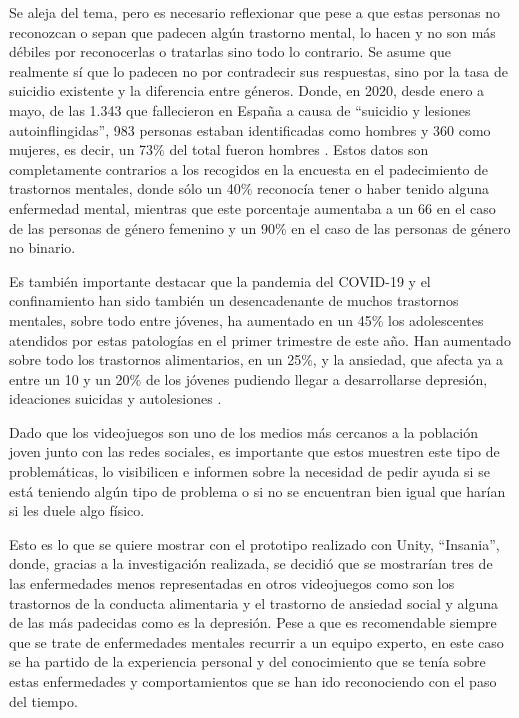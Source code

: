 \documentclass[12pt, a4paper,twoside,titlepage]{book}
\begin{document}
Se aleja del tema, pero es necesario reflexionar que pese a que estas personas no reconozcan o sepan que padecen algún trastorno mental, lo hacen y no son más débiles por reconocerlas o tratarlas sino todo lo contrario. Se asume que realmente sí que lo padecen no por contradecir sus respuestas, sino por la tasa de suicidio existente y la diferencia entre géneros. Donde, en 2020, desde enero a mayo, de las 1.343 que fallecieron en España a causa de ``suicidio y lesiones autoinflingidas'', 983 personas estaban identificadas como hombres y 360 como mujeres, es decir, un 73\% del total fueron hombres \cite{datosINEsuicidio}. Estos datos son completamente contrarios a los recogidos en la encuesta en el padecimiento de trastornos mentales, donde sólo un 40\% reconocía tener o haber tenido alguna enfermedad mental, mientras que este porcentaje aumentaba a un 66 en el caso de las personas de género femenino y un 90\% en el caso de las personas de género no binario. 

Es también importante destacar que la pandemia del COVID-19 y el confinamiento han sido también un desencadenante de muchos trastornos mentales, sobre todo entre jóvenes, ha aumentado en un 45\% los adolescentes atendidos por estas patologías en el primer trimestre de este año. Han aumentado sobre todo los trastornos alimentarios, en un 25\%, y la ansiedad, que afecta ya a entre un 10 y un 20\% de los jóvenes pudiendo llegar a desarrollarse depresión, ideaciones suicidas y autolesiones \cite{datosEnfJovenes}.  


Dado que los videojuegos son uno de los medios más cercanos a la población joven junto con las redes sociales, es importante que estos muestren este tipo de problemáticas, lo visibilicen e informen sobre la necesidad de pedir ayuda si se está teniendo algún tipo de problema o si no se encuentran bien igual que harían si les duele algo físico. 

Esto es lo que se quiere mostrar con el prototipo realizado con Unity, ``Insania'', donde, gracias a la investigación realizada, se decidió que se mostrarían tres de las enfermedades menos representadas en otros videojuegos como son los trastornos de la conducta alimentaria y el trastorno de ansiedad social y alguna de las más padecidas como es la depresión. Pese a que es recomendable siempre que se trate de enfermedades mentales recurrir a un equipo experto, en este caso se ha partido de la experiencia personal y del conocimiento que se tenía sobre estas enfermedades y comportamientos que se han ido reconociendo con el paso del tiempo. 
\end{document}

